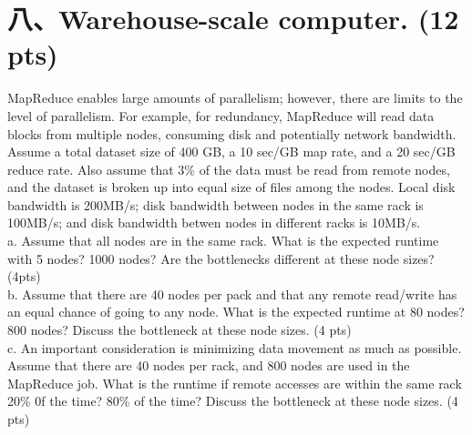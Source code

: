\documentclass[UTF8]{ctexart}
\begin{document}
\section*{八、Warehouse-scale computer. (12 pts)}
MapReduce enables large amounts of parallelism; however, there are limits to the level of parallelism. For example, for redundancy, MapReduce will 
read data blocks from multiple nodes, consuming disk and potentially network bandwidth. Assume a total dataset size of 400 GB, a 10 sec/GB map rate, 
and a 20 sec/GB reduce rate. Also assume that 3\% of the data must be read from remote nodes, and the dataset is broken up into equal size of files 
among the nodes. Local disk bandwidth is 200MB/s; disk bandwidth between nodes in the same rack is 100MB/s; and disk bandwidth betwen nodes in 
different racks is 10MB/s.\\
a. Assume that all nodes are in the same rack. What is the expected runtime with 5 nodes? 1000 nodes? Are the bottlenecks different at these node 
sizes? (4pts)\\
b. Assume that there are 40 nodes per pack and that any remote read/write has an equal chance of going to any node. What is the expected runtime at 
80 nodes? 800 nodes? Discuss the bottleneck at these node sizes. (4 pts)\\
c. An important consideration is minimizing data movement as much as possible. Assume that there are 40 nodes per rack, and 800 nodes are used in the 
MapReduce job. What is the runtime if remote accesses are within the same rack 20\% 0f the time? 80\% of the time? Discuss the bottleneck at these 
node sizes. (4 pts)\\
\end{document}
